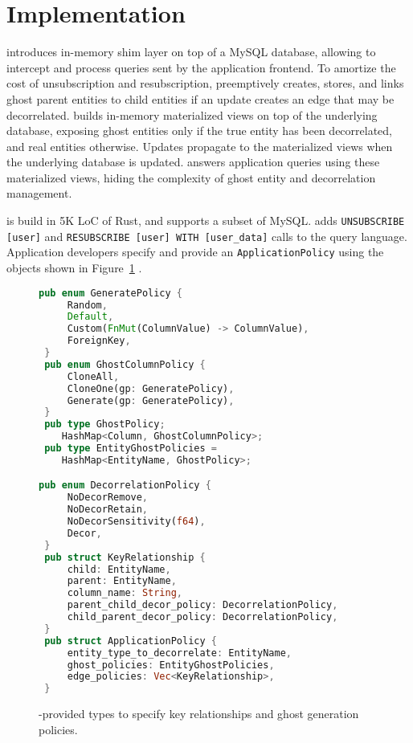 \section{Implementation}

\sys introduces in-memory shim layer on top of a MySQL database, 
allowing \sys to intercept and process queries sent by the application frontend. 
To amortize the cost of unsubscription and resubscription, \sys preemptively creates, stores, and
links ghost parent entities to child entities if an update creates an edge that may be decorrelated.
\sys builds in-memory materialized views on top of the underlying database, exposing ghost
entities only if the true entity has been decorrelated, and real entities otherwise. Updates
propagate to the materialized views when the underlying database is updated. \sys answers
application queries using these materialized views, hiding the complexity of ghost entity and
decorrelation management.

\sys is build in 5K LoC of Rust, and supports a subset of MySQL. \sys adds \texttt{UNSUBSCRIBE
[user]} and \texttt{RESUBSCRIBE [user] WITH [user\_data]} calls to the query language.
Application developers specify and provide an \texttt{ApplicationPolicy} using the objects shown in
Figure~\ref{fig:policytype} .

\begin{figure}
\begin{lstlisting}[language=Rust]
 pub enum GeneratePolicy {
     Random,
     Default,
     Custom(FnMut(ColumnValue) -> ColumnValue),
     ForeignKey, 
 }
 pub enum GhostColumnPolicy {
     CloneAll,
     CloneOne(gp: GeneratePolicy),
     Generate(gp: GeneratePolicy),
 }
 pub type GhostPolicy;
    HashMap<Column, GhostColumnPolicy>;
 pub type EntityGhostPolicies = 
    HashMap<EntityName, GhostPolicy>;

pub enum DecorrelationPolicy {
     NoDecorRemove,
     NoDecorRetain,
     NoDecorSensitivity(f64),
     Decor,
 }
 pub struct KeyRelationship {
     child: EntityName,
     parent: EntityName,
     column_name: String,
     parent_child_decor_policy: DecorrelationPolicy,
     child_parent_decor_policy: DecorrelationPolicy,
 }
 pub struct ApplicationPolicy {
     entity_type_to_decorrelate: EntityName,
     ghost_policies: EntityGhostPolicies,
     edge_policies: Vec<KeyRelationship>,
 }
\end{lstlisting}
    \label{fig:policytype}
    \caption{\sys-provided types to specify key relationships and ghost generation policies.}
\end{figure}

